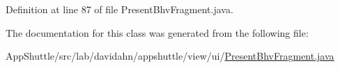\-Definition at line 87 of file \-Present\-Bhv\-Fragment.\-java.



\-The documentation for this class was generated from the following file\-:\begin{DoxyCompactItemize}
\item 
\-App\-Shuttle/src/lab/davidahn/appshuttle/view/ui/\hyperlink{_present_bhv_fragment_8java}{\-Present\-Bhv\-Fragment.\-java}\end{DoxyCompactItemize}
